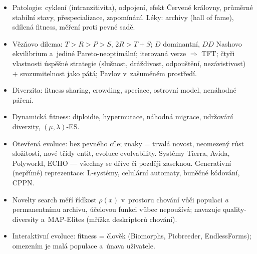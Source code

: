 \documentclass[11pt,a4paper]{article}
\theoremstyle{definition}
\begin{document}
\begin{itemize}
 sítě. \emph{Kooperativní}: dekompozice na komponenty, CCGA,
 moduly $+$ blueprinty.
\item Patologie: cyklení (in\-tran\-zi\-ti\-vi\-ta), odpojení, efekt Červené
 královny, průměrné stabilní stavy, přespecializace, zapomínání.
 Léky: archivy (hall of fame), sdílená fitness, měření proti pevné sadě.
\item Vězňovo dilema: $T>R>P>S$, $2R > T+S$; $D$ dominantní, $DD$ Nashovo
 ekvilibrium a~jediné Pareto-neoptimální; iterovaná verze $\Rightarrow$ TFT;
 čtyři vlastnosti úspěšné strategie (slušnost, dráždivost, odpouštění,
 nezávistivost) $+$ srozumitelnost jako pátá; Pavlov v~zašuměném prostředí.
\item Diverzita: fitness sharing, crowding, speciace, ostrovní model,
 nenáhodné páření.
\item Dynamická fitness: diploidie, hypermutace, náhodná migrace, udržování
 diverzity, $(\mu,\lambda)$-ES.
\item Otevřená evoluce: bez pevného cíle; znaky = trvalá novost, neomezený růst
 složitosti, nové třídy entit, evoluce evolvability. Systémy Tierra, Avida,
 Polyworld, ECHO --- všechny se dříve či později zaseknou.
 Generativní (nepřímé) reprezentace: L-systémy, celulární automaty,
 buněčné kódování, CPPN.
\item Novelty search měří řídkost $\rho(x)$ v~prostoru chování vůči populaci
 \emph{a} permanentnímu archivu, účelovou funkci vůbec nepoužívá;
 navazuje quality-diversity a~MAP-Elites (mřížka deskriptorů chování).
\item Interaktivní evoluce: fitness = člověk (Biomorphs, Picbreeder,
 EndlessForms); omezením je malá populace a~únava uživatele.
\end{itemize}
\end{document}

